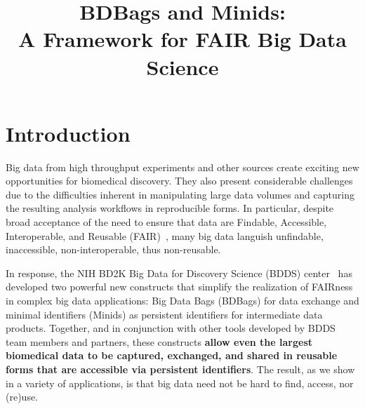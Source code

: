 \documentclass[11pt]{article}
\title{BDBags and Minids:\\A Framework for FAIR Big Data Science}
\author{}
\date{}
\begin{document}
\maketitle


\section{Introduction}

Big data from high throughput experiments and other sources create exciting new opportunities for biomedical discovery. 
They also present considerable challenges %
due to the difficulties inherent in manipulating large data volumes and capturing the resulting analysis workflows in reproducible forms.
In particular, despite broad acceptance of the need to ensure that data are
Findable, Accessible, Interoperable, and Reusable (FAIR)~\cite{wilkinson16},
many big data languish unfindable, inaccessible, non-interoperable, thus non-reusable.

In response, the NIH BD2K Big Data for Discovery Science (BDDS) center~\cite{toga15}
has developed two powerful new constructs that simplify the realization of FAIRness in 
complex big data applications: Big Data Bags (BDBags) for data exchange and 
minimal identifiers (Minids) as persistent identifiers for intermediate data products.
Together, and in conjunction with other tools developed by BDDS team members and partners,
these constructs \textbf{allow even the largest biomedical data to be captured, exchanged, and shared 
in reusable forms that are accessible via persistent identifiers}. 
The result, as we show in a variety of applications, is that big data need not be hard to find, access, nor (re)use. 

\vspace{2ex}
\end{document}

